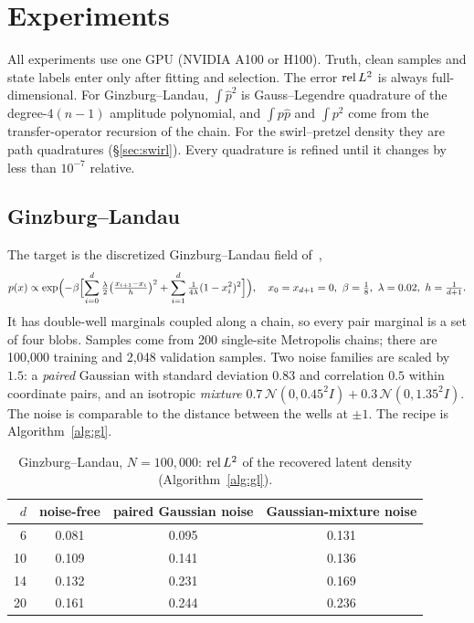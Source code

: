 \section{Experiments}
\label{sec:experiments}

All experiments use one GPU (NVIDIA A100 or H100). Truth, clean samples and state labels enter only after fitting and selection. The
error $\operatorname{rel}L^2$ is always full-dimensional. For Ginzburg--Landau, $\int\hat p^2$ is Gauss--Legendre quadrature of
the degree-$4(n-1)$ amplitude polynomial, and $\int p\hat p$ and $\int p^2$ come from the transfer-operator
recursion of the chain. For the swirl--pretzel density they are path quadratures (\S\ref{sec:swirl}). Every quadrature is
refined until it changes by less than $10^{-7}$ relative.

\subsection{Ginzburg--Landau}
\label{sec:gl}
The target is the discretized Ginzburg--Landau field of~\cite[Simulation IV]{peng2024vrs},
\[
  p(x)\propto\exp\Bigl(-\beta\Bigl[\sum_{i=0}^{d}\tfrac{\lambda}{2}\bigl(\tfrac{x_{i+1}-x_i}{h}\bigr)^2
  +\sum_{i=1}^{d}\tfrac1{4\lambda}(1-x_i^2)^2\Bigr]\Bigr),\quad x_0=x_{d+1}=0,\ \beta=\tfrac18,\ \lambda=0.02,\ h=\tfrac1{d+1}.
\]
It has double-well marginals coupled along a chain, so every pair marginal is a set of four blobs. Samples come
from 200 single-site Metropolis chains; there are 100{,}000 training and 2{,}048 validation samples. Two noise families
are scaled by $1.5$: a \emph{paired} Gaussian with standard deviation $0.83$ and correlation $0.5$ within
coordinate pairs, and an isotropic \emph{mixture} $0.7\,\mathcal N(0,0.45^2I)+0.3\,\mathcal N(0,1.35^2I)$. The noise
is comparable to the distance between the wells at $\pm1$. The recipe is Algorithm~\ref{alg:gl}.

\begin{table}[h]
\centering
\begin{tabular}{rccc}
\toprule
$d$ & noise-free & paired Gaussian noise & Gaussian-mixture noise \\
\midrule
6  & 0.081 & 0.095 & 0.131 \\
10 & 0.109 & 0.141 & 0.136 \\
14 & 0.132 & 0.231 & 0.169 \\
20 & 0.161 & 0.244 & 0.236 \\
\bottomrule
\end{tabular}
\caption{Ginzburg--Landau, $N=100{,}000$: $\operatorname{rel}L^2$ of the recovered latent density (Algorithm~\ref{alg:gl}).}
\label{tab:gl}
\end{table}

